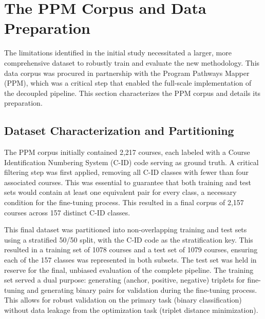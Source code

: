 \section{The PPM Corpus and Data Preparation}\label{ch:3.2}
The limitations identified in the initial study necessitated a larger, more comprehensive dataset to robustly train and evaluate the new methodology. This data corpus was procured in partnership with the Program Pathways Mapper (PPM), which was a critical step that enabled the full-scale implementation of the decoupled pipeline. This section characterizes the PPM corpus and details its preparation.

\subsection{Dataset Characterization and Partitioning}\label{ch:3.2.1}
The PPM corpus initially contained 2,217 courses, each labeled with a Course Identification Numbering System (C-ID) code serving as ground truth. A critical filtering step was first applied, removing all C-ID classes with fewer than four associated courses. This was essential to guarantee that both training and test sets would contain at least one equivalent pair for every class, a necessary condition for the fine-tuning process. This resulted in a final corpus of 2,157 courses across 157 distinct C-ID classes.

This final dataset was partitioned into non-overlapping training and test sets using a stratified 50/50 split, with the C-ID code as the stratification key. This resulted in a training set of 1078 courses and a test set of 1079 courses, ensuring each of the 157 classes was represented in both subsets. The test set was held in reserve for the final, unbiased evaluation of the complete pipeline. The training set served a dual purpose: generating (anchor, positive, negative) triplets for fine-tuning and generating binary pairs for validation during the fine-tuning process. This allows for robust validation on the primary task (binary classification) without data leakage from the optimization task (triplet distance minimization).

